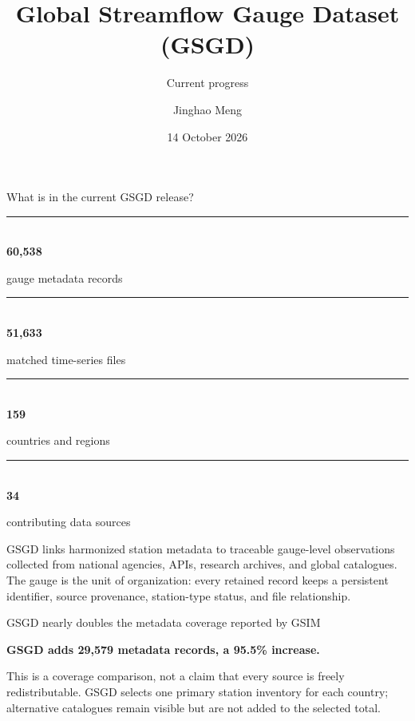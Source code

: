 \documentclass[t,aspectratio=169,10pt]{beamer}
\title{Global Streamflow Gauge Dataset (GSGD)}
\subtitle{Current progress}
\author{Jinghao Meng}
\institute{University of Illinois Urbana-Champaign}
\date{14 October 2026}
\newcommand{\stat}[3]{%
  \begin{minipage}[t]{#1}
    \raggedright
    {\color{GSGDRed}\rule{\linewidth}{0.8pt}}\\[0.13cm]
    {\bfseries\LARGE #2}\par
    \vspace{0.03cm}
    {\sffamily\scriptsize\color{GSGDMuted}#3\par}
  \end{minipage}%
}
\begin{document}
\begin{frame}[c]
  \titlepage
\end{frame}

\begin{frame}{What is in the current GSGD release?}
  \vspace*{0.40cm}
  \centering
  \stat{2.60cm}{60,538}{gauge metadata records}\hspace{0.35cm}
  \stat{2.60cm}{51,633}{matched time-series files}\hspace{0.35cm}
  \stat{2.60cm}{159}{countries and regions}\hspace{0.35cm}
  \stat{2.60cm}{34}{contributing data sources}

  \vspace{0.75cm}
  \begin{minipage}{0.89\textwidth}
    \small
    GSGD links harmonized station metadata to traceable gauge-level observations
    collected from national agencies, APIs, research archives, and global catalogues.
    The gauge is the unit of organization: every retained record keeps a persistent
    identifier, source provenance, station-type status, and file relationship.
  \end{minipage}
\end{frame}

\begin{frame}{GSGD nearly doubles the metadata coverage reported by GSIM}
  \vspace*{0.24cm}
  \centering

  \vspace{0.34cm}
  {\bfseries\Large\color{GSGDRed}GSGD adds 29,579 metadata records, a 95.5\% increase.}\par

  \vspace{0.42cm}
  \begin{minipage}{0.90\textwidth}
    \small
    This is a coverage comparison, not a claim that every source is freely
    redistributable. GSGD selects one primary station inventory for each country;
    alternative catalogues remain visible but are not added to the selected total.
  \end{minipage}
\end{frame}
\end{document}
